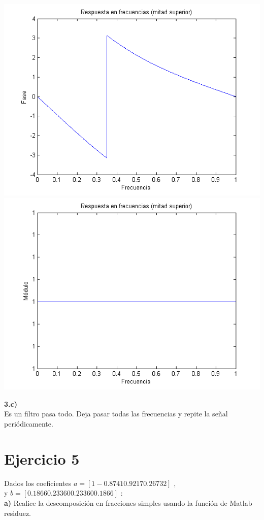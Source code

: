 \documentclass[a4paper,12pt]{article}
\begin{document}
\begin{center}
\includegraphics[width=.8 \textwidth]{ejercicio-4-6-b-fase.png}
\includegraphics[width=.8 \textwidth]{ejercicio-4-6-b-modulo.png}
\end{center}

\textbf{3.c)} \\

Es un filtro pasa todo. Deja pasar todas las frecuencias y repite la señal periódicamente. \\



\section{Ejercicio 5}
Dados los coeficientes $a = [1 -0.8741 0.9217 0.26732]$ , \\ y $b = [0.1866 0.23360 0.23360 0.1866]$ : \\

\textbf{a)} Realice la descomposición en fracciones simples usando la función de Matlab residuez. \\
\end{document}
